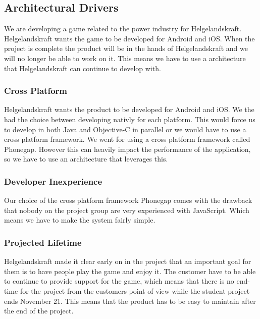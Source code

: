 \subsection{Architectural Drivers}
We are developing a game related to the power industry for Helgelandskraft. Helgelandskraft wants the game to be developed for Android and iOS. When the project is complete the product will be in the hands of Helgelandskraft and we will no longer be able to work on it. This means we have to use a architecture that Helgelandskraft can continue to develop with.

\subsubsection{Cross Platform}
Helgelandskraft wants the product to be developed for Android and iOS. We the had the choice between developing nativly for each platform. This would force us to develop in both Java and Objective-C in parallel or we would have to use a cross platform framework. We went for using a cross platform framework called Phonegap. However this can heavily impact the performance of the application, so we have to use an architecture that leverages this.

\subsubsection{Developer Inexperience}
Our choice of the cross platform framework Phonegap comes with the drawback that nobody on the project group are very experienced with JavaScript. Which means we have to make the system fairly simple.

\subsubsection{Projected Lifetime}
Helgelandskraft made it clear early on in the project that an important goal for them is to have people play the game and enjoy it. The customer have to be able to continue to provide support for the game, which means that there is no end-time for the project from the customers point of view while the student project ends November 21. This means that the product has to be easy to maintain after the end of the project.
